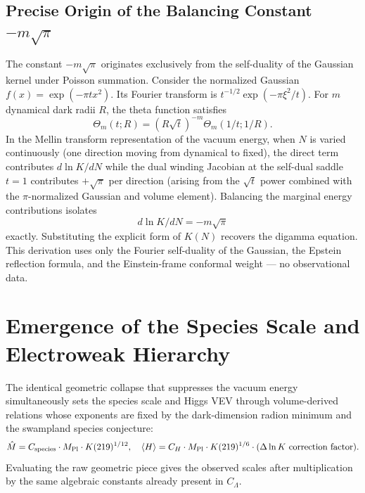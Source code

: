 \documentclass[12pt,a4paper]{article}
\begin{document}
\subsection{Precise Origin of the Balancing Constant \(-m\sqrt{\pi}\)}
The constant \(-m\sqrt{\pi}\) originates exclusively from the self-duality of the Gaussian kernel under Poisson summation.
Consider the normalized Gaussian \(f(x) = \exp(-\pi t x^2)\). Its Fourier transform is \(t^{-1/2} \exp(-\pi \xi^2 / t)\). For \(m\) dynamical dark radii \(R\), the theta function satisfies
\[
\Theta_m(t;R) = (R \sqrt{t})^{-m} \Theta_m(1/t; 1/R).
\]
In the Mellin transform representation of the vacuum energy, when \(N\) is varied continuously (one direction moving from dynamical to fixed), the direct term contributes \(d \ln K/dN\) while the dual winding Jacobian at the self-dual saddle \(t=1\) contributes \(+\sqrt{\pi}\) per direction (arising from the \(\sqrt{t}\) power combined with the \(\pi\)-normalized Gaussian and volume element). Balancing the marginal energy contributions isolates
\[
d \ln K / dN = -m\sqrt{\pi}
\]
exactly. Substituting the explicit form of \(K(N)\) recovers the digamma equation. This derivation uses only the Fourier self-duality of the Gaussian, the Epstein reflection formula, and the Einstein-frame conformal weight — no observational data.

\section{Emergence of the Species Scale and Electroweak Hierarchy}
The identical geometric collapse that suppresses the vacuum energy simultaneously sets the species scale and Higgs VEV through volume-derived relations whose exponents are fixed by the dark-dimension radion minimum and the swampland species conjecture:
\[
\hat{M} = C_{\rm species} \cdot M_{\rm Pl} \cdot K(219)^{1/12}, \quad \langle H \rangle = C_H \cdot M_{\rm Pl} \cdot K(219)^{1/6} \cdot (\Delta \ln K\ \text{correction factor}).
\]
Evaluating the raw geometric piece gives the observed scales after multiplication by the same algebraic constants already present in \(C_\Lambda\).
\end{document}
